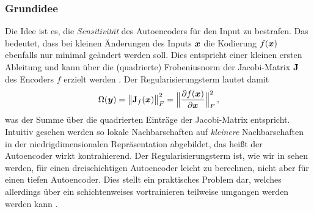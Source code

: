 \subsubsection{Grundidee}
\label{ch:MethodenDerDimRed:CAE:Grundidee}
Die Idee ist
es, die \textit{Sensitivität} des Autoencoders für den Input zu bestrafen. Das bedeutet, dass bei
kleinen Änderungen des Inputs $\bm{x}$ die Kodierung $f(\bm{x})$ ebenfalls nur minimal geändert
werden soll. Dies entspricht einer kleinen ersten Ableitung und kann über die (quadrierte)
Frobeniusnorm der Jacobi-Matrix $\mathbf{J}$ des Encoders $f$ erzielt werden \parencites[2]{Rifai.2011}[521]{Goodfellow.2016}. Der Regularisierungsterm lautet damit
\begin{equation}
	\label{eq:CAE-Regularisierung}
	\Omega(\vect{y}) = \norm[\big]{\mat{J}_f(\vect{x})}_F^2 =  \norm[\Big]{ \frac{\partial f(\vect{x})}{\partial \vect{x}} }^2_F \, ,
\end{equation}
was der Summe über die quadrierten Einträge der Jacobi-Matrix entspricht. Intuitiv gesehen werden so lokale Nachbarschaften auf \textit{kleinere} Nachbarschaften in der niedrigdimensionalen Repräsentation abgebildet, das heißt der Autoencoder wirkt kontrahierend.
Der Regularisierungsterm ist, wie wir in  sehen werden, für einen dreischichtigen Autoencoder leicht zu berechnen, nicht aber für einen tiefen Autoencoder. Dies stellt ein praktisches Problem dar, welches allerdings über ein schichtenweises vortrainieren teilweise umgangen werden werden kann \parencite[vgl.][522]{Goodfellow.2016}.

